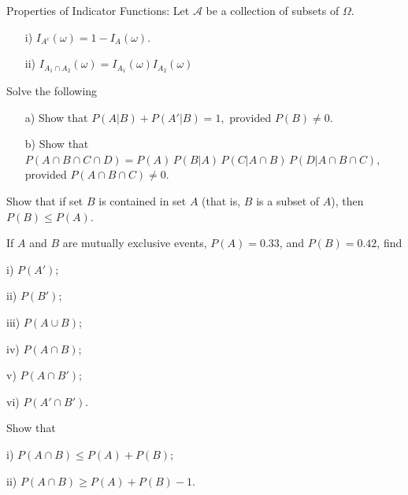 \begin{Quest} Properties of Indicator Functions: Let $\mathcal{A}$ be a collection of subsets of $\Omega$.

\begin{itemize}
\item[i) ] $I_{A^c}(\omega) = 1 - I_A(\omega)$.
\item[ii) ]  $I_{A_1 \cap A_2}(\omega)= I_{A_1}(\omega) I_{A_2}(\omega)$
\end{itemize}
\end{Quest}


\begin{Quest} Solve the following
\begin{itemize}
\item[a) ] Show that $P(A|B) + P(A'|B) = 1,$ provided $P(B) \neq 0$.

\item[b) ] Show that $P(A \cap B \cap C \cap D)= P(A)\,P(B|A)\,P(C|A \cap B)\,P(D|A \cap B \cap C),$ provided $P(A \cap B \cap C) \neq 0$.
\end{itemize}
\end{Quest}

\begin{Quest} Show that if set $B$ is contained in set $A$ (that is, $B$ is a subset of $A$), then
$P(B)\le P(A).$
\end{Quest}

\begin{Quest}
If $A$ and $B$ are mutually exclusive events, $P(A)=0.33$, and $P(B)=0.42$, find

\begin{itemize}
\begin{multicols}{3}
\item[i) ] $P(A')$;
\item[ii) ] $P(B')$;
\item[iii) ] $P(A\cup B)$;
\item[iv) ] $P(A\cap B)$;
\item[v) ] $P(A\cap B')$;
\item[vi) ] $P(A'\cap B')$.
\end{multicols}
\end{itemize}
\end{Quest}

\begin{Quest}
Show that
\begin{itemize}
\begin{multicols}{2}
\item[i) ] $P(A\cap B) \le P(A)+P(B)$;
\item[ii) ] $P(A\cap B) \ge P(A)+P(B)-1$.
\end{multicols}
\end{itemize}
\end{Quest}

